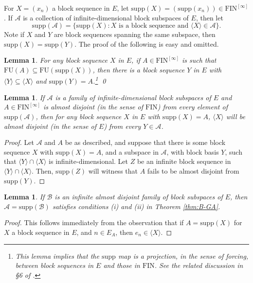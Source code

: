 \documentclass[11pt]{amsart}
\newcommand{\LA}{\mathcal{A}}
\newcommand{\LB}{\mathcal{B}}
\newtheorem{lemma}[thm]{Lemma}
\theoremstyle{definition}
\theoremstyle{remark}
\newcommand{\supp}{\mathrm{supp}}
\renewcommand{\1}{\mathbf{1}}
\newcommand{\FIN}{\mathrm{FIN}}
\newcommand{\FU}{\mathrm{FU}}
\begin{document}
For $X=(x_n)$ a block sequence in $E$, let $\supp(X)=(\supp(x_n))\in\FIN^{[\infty]}$. If $\LA$ is a collection of infinite-dimensional block subspaces of $E$, then let 
\[
	\supp(\LA)=\{\supp(X):\text{$X$ is a block sequence and }\langle X\rangle\in\LA\}.
\]
Note if $X$ and $Y$ are block sequences spanning the same subspace, then $\supp(X)=\supp(Y)$. The proof of the following is easy and omitted.

\begin{lemma}\label{lem:supp_proj}
	For any block sequence $X$ in $E$, if $A\in\FIN^{[\infty]}$ is such that $\FU(A)\subseteq\FU(\supp(X))$, then there is a block sequence $Y$ in $E$ with $\langle Y\rangle\subseteq\langle X\rangle$ and $\supp(Y)=A$.\footnote{This lemma implies that the $\supp$ map is a \emph{projection}, in the sense of forcing, between block sequences in $E$ and those in $\FIN$. See the related discussion in \S 6 of \cite{MR3864398}.}	\qed
\end{lemma}


\begin{lemma}\label{lem:supp_ad}
	If $\LA$ is a family of infinite-dimensional block subspaces of $E$ and $A\in\FIN^{[\infty]}$ is almost disjoint (in the sense of $\FIN$) from every element of $\supp(\LA)$, then for any block sequence $X$ in $E$ with $\supp(X)=A$, $\langle X\rangle$ will be almost disjoint (in the sense of $E$) from every $Y\in\LA$.
\end{lemma}

\begin{proof}
	Let $\LA$ and $A$ be as described, and suppose that there is some block sequence $X$ with $\supp(X)=A$, and a subspace in $\LA$, with block basis $Y$, such that $\langle Y\rangle\cap\langle X\rangle$ is infinite-dimensional. Let $Z$ be an infinite block sequence in $\langle Y\rangle\cap\langle X\rangle$. Then, $\supp(Z)$ will witness that $A$ fails to be almost disjoint from $\supp(Y)$.
\end{proof}

\begin{lemma}\label{lem:supp_B-GA}
	If $\LB$ is an infinite almost disjoint family of block subspaces of $E$, then $\LA=\supp(\LB)$ satisfies conditions (i) and (ii) in Theorem \ref{thm:B-GA}.
\end{lemma}

\begin{proof}
	This follows immediately from the observation that if $A=\supp(X)$ for $X$ a block sequence in $E$, and $n\in E_A$, then $e_n\in\langle X\rangle$.
\end{proof}
\end{document}
